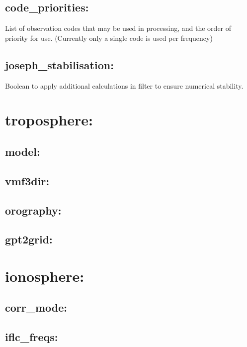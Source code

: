 \subsection*{code\_priorities:}
List of observation codes that may be used in processing, and the order of priority for use. (Currently only a single code is used per frequency)

\subsection*{joseph\_stabilisation:}
Boolean to apply additional calculations in filter to ensure numerical stability.










\section{troposphere:}

\subsection*{model:}

\subsection*{vmf3dir:}

\subsection*{orography:}

\subsection*{gpt2grid:}




\section{ionosphere:}

\subsection*{corr\_mode:}

\subsection*{iflc\_freqs:}





